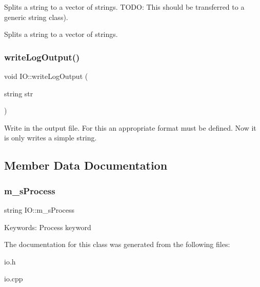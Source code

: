 Splits a string to a vector of strings. T\+O\+DO\+: This should be transferred to a generic string class). 

Splits a string to a vector of strings. \mbox{\label{classIO_a6e0785ec87e3b11635a4563977520a99}} 
\subsubsection{\texorpdfstring{write\+Log\+Output()}{writeLogOutput()}}
{\footnotesize\ttfamily void I\+O\+::write\+Log\+Output (\begin{DoxyParamCaption}\item[{string}]{str }\end{DoxyParamCaption})}

Write in the output file. For this an appropriate format must be defined. Now it is only writes a simple string. 

\subsection{Member Data Documentation}
\mbox{\label{classIO_a7685f7b9fcdf945b14bb3ca100e0cf49}} 
\subsubsection{\texorpdfstring{m\+\_\+s\+Process}{m\_sProcess}}
{\footnotesize\ttfamily string I\+O\+::m\+\_\+s\+Process\hspace{0.3cm}{\ttfamily [protected]}}

Keywords\+: Process keyword 

The documentation for this class was generated from the following files\+:\begin{DoxyCompactItemize}
\item 
io.\+h\item 
io.\+cpp\end{DoxyCompactItemize}
